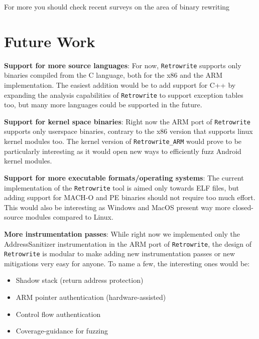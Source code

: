 \documentclass[a4paper,11pt,oneside]{report}
\begin{document}
For more you should check recent surveys on the area of binary rewriting 
\cite{binaryrewritingsurvey}


\chapter{Future Work}

{

\setlength{\parindent}{0cm}
\hangindent=0.7cm \textbf{Support for more source languages}: For now, 
\texttt{Retrowrite} supports only binaries compiled from the C language, both 
for the x86 and the ARM implementation. The easiest addition would be to add 
support for C++ by expanding the analysis capabilities of \texttt{Retrowrite} 
to support exception tables too, but many more languages could be supported in 
the future. 

\hangindent=0.7cm \textbf{Support for kernel space binaries}: Right now the ARM 
port of \texttt{Retrowrite} supports only userspace binaries, contrary to the 
x86 version that supports linux kernel modules too. The kernel version of 
\texttt{Retrowrite\_ARM} would prove to be particularly interesting as it would 
open new ways to efficiently fuzz Android kernel modules.

\hangindent=0.7cm \textbf{Support for more executable formats/operating 
systems}: The current implementation of the \texttt{Retrowrite} tool is aimed 
only towards ELF files, but adding support for MACH-O and PE binaries should 
not require too much effort. This would also be interesting as Windows and 
MacOS present way more closed-source modules compared to Linux.

\hangindent=0.7cm \textbf{More instrumentation passes}: While right now we 
implemented only the AddressSanitizer instrumentation in the ARM port of
\texttt{Retrowrite}, the design of \texttt{Retrowrite} is modular to make
adding new instrumentation passes or new mitigations very easy for anyone. To
name a few, the interesting ones would be:
\begin{itemize}
	\item Shadow stack (return address protection)
	\item ARM pointer authentication (hardware-assisted)
	\item Control flow authentication
	\item Coverage-guidance for fuzzing
\end{itemize}

}
\end{document}
